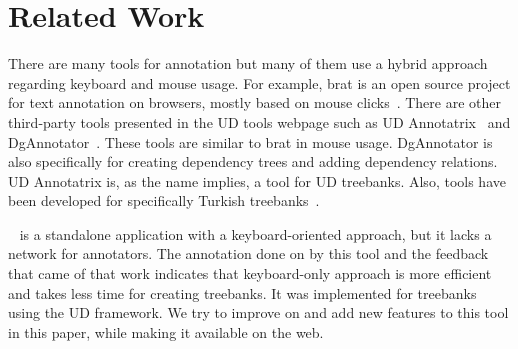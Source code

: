 \section{Related Work}
\label{sec:related}

There are many tools for annotation but many of them use a hybrid approach regarding keyboard and mouse usage.
For example, brat is an open source project for text annotation on browsers, mostly based on mouse clicks~\cite{brat}\cite{UD}.
There are other third-party tools presented in the UD tools webpage such as UD Annotatrix~\cite{tyers-etal:2018} and DgAnnotator~\cite{dgannotator}.
These tools are similar to brat in mouse usage.
DgAnnotator is also specifically for creating dependency trees and adding dependency relations.
UD Annotatrix is, as the name implies, a tool for UD treebanks.
Also, tools have been developed for specifically Turkish treebanks~\cite{turk-etal-2019-turkish}.

\boatvone~\cite{turk-etal-2019-turkish} is a standalone application with a keyboard-oriented approach, but it lacks a network for annotators.
The annotation done on \bountreebank{} by this tool and the feedback that came of that work indicates that keyboard-only approach is more efficient and takes less time for creating treebanks.
It was implemented for treebanks using the UD framework.
We try to improve on and add new features to this tool in this paper, while making it available on the web.
